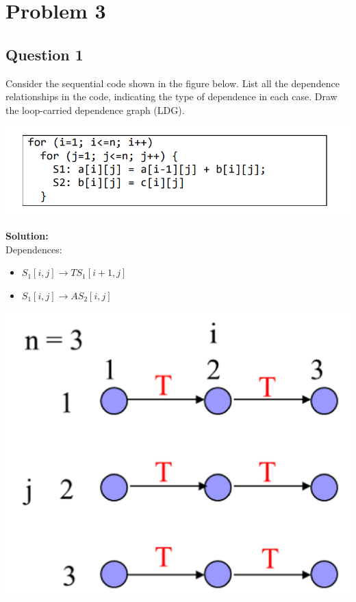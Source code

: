 \documentclass{article}
\begin{document}
\section{Problem 3}
\subsection{Question 1}
Consider the sequential code shown in the figure below. List all the dependence 
relationships in the code, indicating the type of dependence in each case. Draw 
the loop-carried dependence graph (LDG).
\begin{center}
    \includegraphics[scale = 0.4]{2.png}\\
\end{center}
\textbf{Solution:}\\
Dependences:
\begin{itemize}
    \item $S_{1}[i,j]\rightarrow TS_{1}[i+1,j]$
    \item $S_{1}[i,j]\rightarrow AS_{2}[i,j]$
\end{itemize} 
\begin{center}
    \includegraphics[scale = 0.25]{3.png}\\
\end{center}
\end{document}
